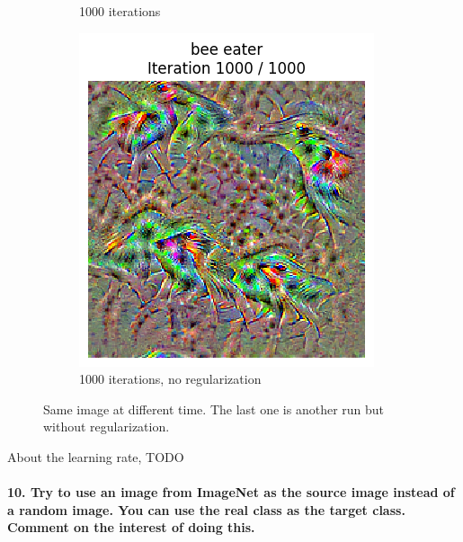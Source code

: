 \begin{figure}[H]
\begin{subfigure}[t]{.25\textwidth}
        \caption{1000 iterations}
        \label{fig:class_viz_iter:sub3}
    \end{subfigure}%
    \begin{subfigure}[t]{.25\textwidth}
        \centering
        \includegraphics[width=\linewidth]{figs/2b/SqueezeNet/SqueezeNet_bird_animated_1000_last_frame.png}
        \caption{1000 iterations, no regularization}
        \label{fig:class_viz_iter:sub4}
    \end{subfigure}

    \caption{Same image at different time. The last one is another run but without regularization.}
    \label{fig:class_viz_iter}
\end{figure}

About the learning rate, TODO %

\paragraph*{10. Try to use an image from ImageNet as the source image instead of a random image. You can use the real class as the target class. Comment on the interest of doing this.}


